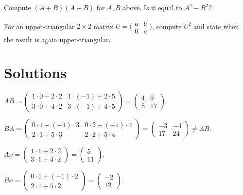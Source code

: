 \begin{problems}
    \item Compute $(A + B)(A - B)$ for $A, B$ above. Is it equal to $A^{2} - B^{2}$?
    \item For an upper-triangular $2 \times 2$ matrix $U = \bigl(\begin{smallmatrix} a & b \\ 0 & c \end{smallmatrix}\bigr)$, compute $U^{2}$ and state when the result is again upper-triangular.
\end{problems}

\section{Solutions}

\begin{solutions}
    \item $A B = \begin{pmatrix} 1 \cdot 0 + 2 \cdot 2 & 1 \cdot (-1) + 2 \cdot 5 \\ 3 \cdot 0 + 4 \cdot 2 & 3 \cdot (-1) + 4 \cdot 5 \end{pmatrix} = \begin{pmatrix} 4 & 9 \\ 8 & 17 \end{pmatrix}$.

    \item $B A = \begin{pmatrix} 0 \cdot 1 + (-1) \cdot 3 & 0 \cdot 2 + (-1) \cdot 4 \\ 2 \cdot 1 + 5 \cdot 3 & 2 \cdot 2 + 5 \cdot 4 \end{pmatrix} = \begin{pmatrix} -3 & -4 \\ 17 & 24 \end{pmatrix} \neq A B$.

    \item $A x = \begin{pmatrix} 1 \cdot 1 + 2 \cdot 2 \\ 3 \cdot 1 + 4 \cdot 2 \end{pmatrix} = \begin{pmatrix} 5 \\ 11 \end{pmatrix}$.

    \item $B x = \begin{pmatrix} 0 \cdot 1 + (-1) \cdot 2 \\ 2 \cdot 1 + 5 \cdot 2 \end{pmatrix} = \begin{pmatrix} -2 \\ 12 \end{pmatrix}$.


\end{solutions}
